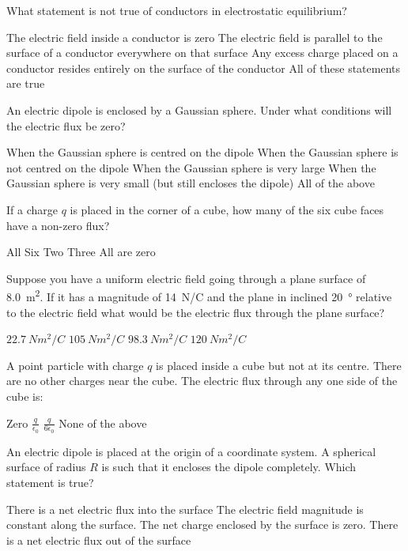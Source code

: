 \question What statement is not true of conductors in electrostatic equilibrium?
\begin{checkboxes}
\choice The electric field inside a conductor is zero
\CorrectChoice The electric field is parallel to the surface of a conductor everywhere on that surface \correct
\choice Any excess charge placed on a conductor resides entirely on the surface of the conductor
\choice All of these statements are true
\end{checkboxes}

\question An electric dipole is enclosed by a Gaussian sphere. Under what conditions will the electric flux be zero? 
\begin{checkboxes}
\choice When the Gaussian sphere is centred on the dipole
\choice When the Gaussian sphere is not centred on the dipole
\choice When the Gaussian sphere is very large
\choice When the Gaussian sphere is very small (but still encloses the dipole)
\CorrectChoice All of the above \correct
\end{checkboxes}


\question If a charge $q$ is placed in the corner of a cube, how many of the six cube faces have a non-zero flux?
\begin{checkboxes}
\choice All Six
\choice Two
\CorrectChoice Three \correct
\choice All are zero
\end{checkboxes}


\question Suppose you have a uniform electric field going through a plane surface of \SI{8.0}{m^2}. If it has a magnitude of \SI{14}{N/C} and the plane in inclined \SI{20}{\degree} relative to the electric field what would be the electric flux through the plane surface?
\begin{checkboxes}
\choice $\SI{22.7}{Nm^2/C} $
\CorrectChoice $\SI{105}{Nm^2/C} $ \correct
\choice $\SI{98.3}{Nm^2/C} $
\choice $\SI{120}{Nm^2/C} $
\end{checkboxes}

\question A point particle with charge $q$ is placed inside a cube but not at its centre. There are no other charges near the cube. The electric flux through any one side of the cube is:
\begin{choices} 
\choice Zero
\choice $\frac{q}{\epsilon_0}$
\choice $\frac{q}{6\epsilon_0}$
\CorrectChoice None of the above \correct
\end{choices}

\question An electric dipole is placed at the origin of a coordinate system. A spherical surface of radius $R$ is such that it encloses the dipole completely. Which statement is true?
\begin{checkboxes}
\choice There is a net electric flux into the surface
\choice The electric field magnitude is constant along the surface.
\CorrectChoice The net charge enclosed by the surface is zero. \correct
\choice There is a net electric flux out of the surface
\end{checkboxes}

